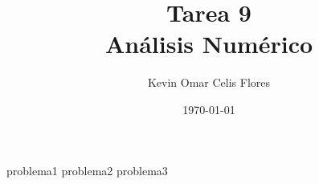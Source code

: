\documentclass[11pt, oneside]{article}
\title{Tarea 9\\Análisis Numérico}
\author{Kevin Omar Celis Flores}
\date{\today}
\begin{document}
\maketitle

{problema1}\newpage
{problema2}\newpage
{problema3}
\end{document}

